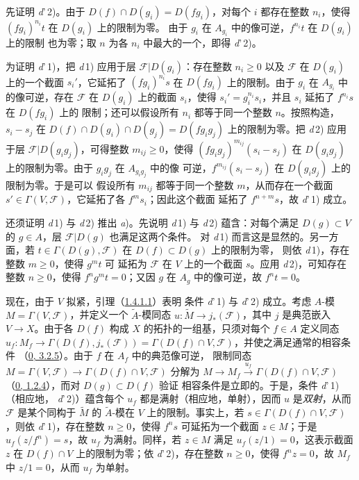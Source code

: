 \documentclass[UTF8,fontset=none,11pt,oneside,openany]{ctexbook}
\newcommand{\oldpage}[2][]{%
  \hypertarget{ega-source-page-#1-#2}{}%
  \marginnote{\scriptsize\textbf{#1}~|~#2}\ignorespaces}
\begin{document}
先证明 \textit{d}'\,2)。由于 $D(f)\cap D(g_i)=D(fg_i)$，对每个 $i$
都存在整数 $n_i$，使得 $(fg_i)^{n_i}t$ 在 $D(g_i)$ 上的限制为零。
由于 $g_i$ 在 $A_{g_i}$ 中的像可逆，$f^{n_i}t$ 在 $D(g_i)$ 上的限制
也为零；取 $n$ 为各 $n_i$ 中最大的一个，即得 \textit{d}'\,2)。

为证明 \textit{d}'\,1)，把 \textit{d}\,1) 应用于层
$\mathscr{F}|D(g_i)$：存在整数 $n_i\geq0$ 以及 $\mathscr{F}$ 在
$D(g_i)$ 上的一个截面 $s_i'$，它延拓了 $(fg_i)^{n_i}s$ 在
$D(fg_i)$ 上的限制。由于 $g_i$ 在 $A_{g_i}$ 中的像可逆，存在
$\mathscr{F}$ 在 $D(g_i)$ 上的截面 $s_i$，使得
$s_i'=g_i^{n_i}s_i$，并且 $s_i$ 延拓了 $f^{n_i}s$ 在 $D(fg_i)$ 上的
限制；还可以假设所有 $n_i$ 都等于同一个整数 $n$。按照构造，
$s_i-s_j$ 在
$D(f)\cap D(g_i)\cap D(g_j)=D(fg_i g_j)$ 上的限制为零。把
\textit{d}\,2) 应用于层 $\mathscr{F}|D(g_i g_j)$，可得整数
$m_{ij}\geq0$，使得 $(fg_i g_j)^{m_{ij}}(s_i-s_j)$ 在
$D(g_i g_j)$ 上的限制为零。由于 $g_i g_j$ 在 $A_{g_i g_j}$ 中的像
可逆，$f^{m_{ij}}(s_i-s_j)$ 在 $D(g_i g_j)$ 上的限制为零。于是可以
假设所有 $m_{ij}$ 都等于同一个整数 $m$，从而存在一个截面
$s'\in\Gamma(V,\mathscr{F})$，它延拓了各 $f^m s_i$；因此这个截面
延拓了 $f^{n+m}s$，故 \textit{d}'\,1) 成立。

还须证明 \textit{d}\,1) 与 \textit{d}\,2) 推出 \textit{a})。先说明
\textit{d}\,1) 与 \textit{d}\,2) 蕴含：对每个满足
$D(g)\subset V$ 的 $g\in A$，层 $\mathscr{F}|D(g)$ 也满足这两个条件。
对 \textit{d}\,1) 而言这是显然的。另一方面，若
$t\in\Gamma(D(g),\mathscr{F})$ 在 $D(f)\subset D(g)$ 上的限制为零，
则依 \textit{d}\,1)，存在整数 $m\geq0$，使得 $g^m t$ 可
\oldpage[I]{92}
延拓为 $\mathscr{F}$ 在 $V$ 上的一个截面 $s$。应用
\textit{d}\,2)，可知存在整数 $n\geq0$，使得 $f^n g^m t=0$；又因
$g$ 在 $A_g$ 中的像可逆，故 $f^n t=0$。

现在，由于 $V$ 拟紧，引理（\hyperref[I.1.4.1.1-fr]{1.4.1.1}）表明
条件 \textit{d}'\,1) 与 \textit{d}'\,2) 成立。考虑 $A$-模
$M=\Gamma(V,\mathscr{F})$，并定义一个 $\widetilde{A}$-模同态
$u:\widetilde{M}\to j_*(\mathscr{F})$，其中 $j$ 是典范嵌入
$V\to X$。由于各 $D(f)$ 构成 $X$ 的拓扑的一组基，只须对每个
$f\in A$ 定义同态
$u_f:M_f\to\Gamma(D(f),j_*(\mathscr{F}))
=\Gamma(D(f)\cap V,\mathscr{F})$，并使之满足通常的相容条件
（\hyperref[0.3.2.5-fr]{0, 3.2.5}）。由于 $f$ 在 $A_f$ 中的典范像可逆，
限制同态
$M=\Gamma(V,\mathscr{F})\to\Gamma(D(f)\cap V,\mathscr{F})$ 分解为
$M\longrightarrow M_f\xrightarrow{u_f}
\Gamma(D(f)\cap V,\mathscr{F})$
（\hyperref[0.1.2.4-fr]{0, 1.2.4}），而对 $D(g)\subset D(f)$ 验证
相容条件是立即的。于是，条件 \textit{d}'\,1)（相应地，
\textit{d}'\,2)）蕴含每个 $u_f$ 都是满射（相应地，单射），因而 $u$
是\emph{双射}，从而 $\mathscr{F}$ 是某个同构于 $\widetilde{M}$ 的
$\widetilde{A}$-模在 $V$ 上的限制。事实上，若
$s\in\Gamma(D(f)\cap V,\mathscr{F})$，则依 \textit{d}'\,1)，存在整数
$n\geq0$，使得 $f^n s$ 可延拓为一个截面 $z\in M$；于是
$u_f(z/f^n)=s$，故 $u_f$ 为满射。同样，若 $z\in M$ 满足
$u_f(z/1)=0$，这表示截面 $z$ 在 $D(f)\cap V$ 上的限制为零；依
\textit{d}'\,2)，存在整数 $n\geq0$，使得 $f^n z=0$，故 $M_f$ 中
$z/1=0$，从而 $u_f$ 为单射。
\end{document}
